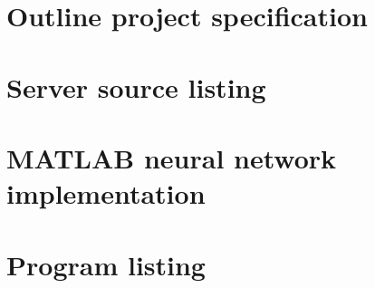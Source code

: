\documentclass[pdftex,12pt,a4paper]{report}
\begin{document}


\thispagestyle{empty}
\mbox{}
\newpage



\thispagestyle{empty}
\mbox{}
\newpage



\thispagestyle{empty}
\mbox{}
\newpage

\tableofcontents
\listoffigures
\listoftables











\titlespacing*{\chapter}{0pt}{0pt}{40pt}



\chapter{Outline project specification}
\label{ap:outlinespec}


\chapter{Server source listing}
\label{ap:server}


\chapter{MATLAB neural network implementation}
\label{ap:matlab}






\chapter{Program listing}
\label{ap:listing}
\end{document}
